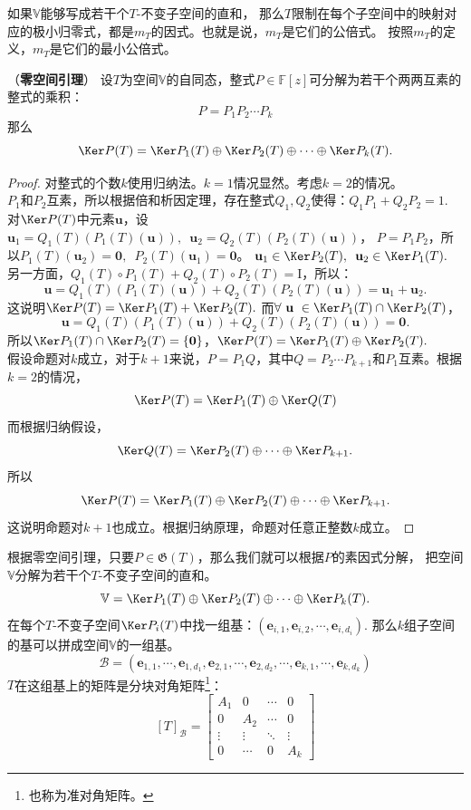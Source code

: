 \documentclass[12pt,UTF8]{ctexbook}
\begin{document}
如果$\mathbb{V}$能够写成若干个$T$-不变子空间的直和，
那么$T$限制在每个子空间中的映射对应的极小归零式，都是$m_T$的因式。也就是说，$m_T$是它们的公倍式。
按照$m_T$的定义，$m_T$是它们的最小公倍式。

\begin{pp}（\textbf{零空间引理}）\label{pp:6_4}
    设$T$为空间$\mathbb{V}$的自同态，整式$P\in\mathbb{F}[z]$可分解为若干个两两互素的整式的乘积：
    $$ P = P_1 P_2\cdots P_k$$
    那么
    $$ \Ker P(T) = \Ker P_1(T) \oplus \Ker P_2(T) \oplus \cdots \oplus \Ker P_k(T). $$
\end{pp}
\begin{proof} %
    对整式的个数$k$使用归纳法。$k=1$情况显然。考虑$k=2$的情况。\\
    $P_1$和$P_2$互素，所以根据倍和析因定理，存在整式$Q_1, Q_2$使得：$Q_1 P_1 + Q_2 P_2 = 1.$\\
    对$\Ker P(T)$中元素$\mathbf{u}$，设$\mathbf{u}_1 = Q_1(T)(P_1(T)(\mathbf{u})), \,\,\, \mathbf{u}_2 = Q_2(T)(P_2(T)(\mathbf{u}))$，
    $P = P_1 P_2$，所以$P_1(T)(\mathbf{u}_2) = \mathbf{0}, \,\,\, P_2(T)(\mathbf{u}_1) = \mathbf{0}$。
    $\mathbf{u}_1 \in \Ker P_2(T), \,\,\, \mathbf{u}_2 \in \Ker P_1(T).$
    另一方面，$Q_1(T) \circ P_1(T) + Q_2(T) \circ P_2(T) = \mathrm{I}$，所以：
    $$ \mathbf{u} = Q_1(T)(P_1(T)(\mathbf{u})) + Q_2(T)(P_2(T)(\mathbf{u})) = \mathbf{u}_1 + \mathbf{u}_2.$$
    这说明$\Ker P(T) = \Ker P_1(T) + \Ker P_2(T).$
    而$\forall \,\, \mathbf{u} \,\, \in \Ker P_1(T) \cap \Ker P_2(T)$，
    $$ \mathbf{u} = Q_1(T)(P_1(T)(\mathbf{u})) + Q_2(T)(P_2(T)(\mathbf{u})) = \mathbf{0}. $$
    所以$\Ker P_1(T) \cap \Ker P_2(T) = \{\mathbf{0}\}$，$\Ker P(T) = \Ker P_1(T) \oplus \Ker P_2(T).$\\
    假设命题对$k$成立，对于$k+1$来说，$P = P_1 Q$，其中$Q = P_2 \cdots P_{k+1}$和$P_1$互素。根据$k=2$的情况， 
    $$ \Ker P(T) = \Ker P_1(T) \oplus \Ker Q(T)$$
    而根据归纳假设，
    $$ \Ker Q(T) = \Ker P_2(T) \oplus \cdots \oplus \Ker P_{k+1}.$$
    所以
    $$ \Ker P(T) = \Ker P_1(T) \oplus \Ker P_2(T) \oplus \cdots \oplus \Ker P_{k+1}.$$
    这说明命题对$k+1$也成立。根据归纳原理，命题对任意正整数$k$成立。
    
\end{proof}


根据零空间引理，只要$P\in\mathfrak{G}(T)$，那么我们就可以根据$P$的素因式分解，
把空间$\mathbb{V}$分解为若干个$T$-不变子空间的直和。
$$ \mathbb{V} = \Ker P_1(T) \oplus \Ker P_2(T) \oplus \cdots \oplus \Ker P_k(T). $$
在每个$T$-不变子空间$\Ker P_i(T)$中找一组基：$(\mathbf{e}_{i,1}, \mathbf{e}_{i,2}, \cdots , \mathbf{e}_{i, d_i})$.
那么$k$组子空间的基可以拼成空间$\mathbb{V}$的一组基。
$$ \mathcal{B} = (\mathbf{e}_{1,1}, \cdots , \mathbf{e}_{1, d_1},\mathbf{e}_{2,1}, \cdots , \mathbf{e}_{2, d_2}, \cdots , \mathbf{e}_{k,1}, \cdots , \mathbf{e}_{k, d_k})$$
$T$在这组基上的矩阵是分块对角矩阵\footnote{也称为准对角矩阵。}：
$$ [T]_{\mathcal{B}} = \begin{bmatrix} A_1 & 0 & \cdots & 0 \\ 0 & A_2 & \cdots & 0 \\ \vdots & \vdots & \ddots & \vdots \\ 0 & \cdots & 0 & A_k\end{bmatrix}$$
\end{document}
